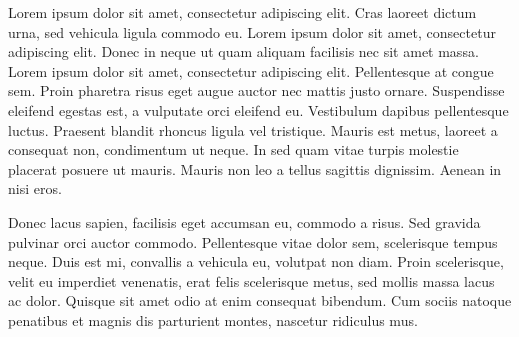 \documentclass[12pt]{hw}
\begin{document}
Lorem ipsum dolor sit amet, consectetur adipiscing elit. Cras laoreet 
dictum urna, sed vehicula ligula commodo eu. Lorem ipsum dolor sit 
amet, consectetur adipiscing elit. Donec in neque ut quam aliquam 
facilisis nec sit amet massa. Lorem ipsum dolor sit amet, consectetur 
adipiscing elit. Pellentesque at congue sem. Proin pharetra risus 
eget augue auctor nec mattis justo ornare. Suspendisse eleifend 
egestas est, a vulputate orci eleifend eu. Vestibulum dapibus 
pellentesque luctus. Praesent blandit rhoncus ligula vel tristique. 
Mauris est metus, laoreet a consequat non, condimentum ut neque. In 
sed quam vitae turpis molestie placerat posuere ut mauris. Mauris non leo a
tellus sagittis dignissim. Aenean in nisi eros.

Donec lacus sapien, facilisis eget accumsan eu, commodo a risus. Sed
gravida pulvinar orci auctor commodo. Pellentesque vitae dolor sem,
scelerisque tempus neque. Duis est mi, convallis a vehicula eu, volutpat
non diam. Proin scelerisque, velit eu imperdiet venenatis, erat felis
scelerisque metus, sed mollis massa lacus ac dolor. Quisque sit amet odio
at enim consequat bibendum. Cum sociis natoque penatibus et magnis dis
parturient montes, nascetur ridiculus mus.
\end{document}
